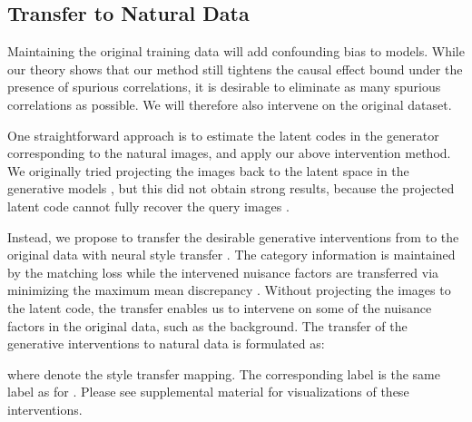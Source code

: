 \documentclass[final]{cvpr}
\begin{document}
\subsection{Transfer to Natural Data}\label{sec:transfer}

Maintaining the original training data  will add confounding bias to models. While our theory shows that our method still tightens the causal effect bound under the presence of spurious correlations, it is desirable to eliminate as many spurious correlations as possible. We will therefore also intervene on the original dataset.



One straightforward approach is to estimate the latent codes in the generator corresponding to the natural images, and apply our above intervention method.  We originally tried projecting the images back to the latent space in the generative models  \cite{zhu2018generative, huh2020ganprojection}, but this did not obtain strong results, because the projected latent code cannot fully recover the query images \cite{bau2019seeing}.

Instead, we propose to transfer the desirable generative interventions from  to the original data  with neural style transfer \cite{style_transfer}. The category information is maintained by the matching loss while the intervened nuisance factors are transferred via minimizing the maximum mean discrepancy \cite{li2017demystifying}. Without projecting the images to the latent code, the transfer enables us to intervene on some of the nuisance factors  in the original data, such as the background. The transfer of the generative interventions  to natural data  is formulated as: 

where  denote the style transfer mapping. The corresponding label  is the same label as for . Please see supplemental material for visualizations of these interventions.
\end{document}
